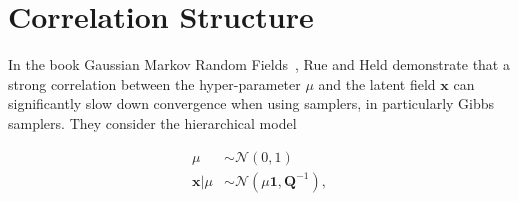 \chapter{Correlation Structure}
\label{ap:Correlation}
In the book Gaussian Markov Random Fields~\cite{rue2005gaussian}, Rue and Held demonstrate that a strong correlation between the hyper-parameter $\mu$ and the latent field $\bm{x}$ can significantly slow down convergence when using samplers, in particularly Gibbs samplers. 
They consider the hierarchical model

\begin{subequations}
\begin{align}
\mu &\sim \mathcal{N}(0, 1) \\
\bm{x} | \mu &\sim \mathcal{N}(\mu \bm{1}, \bm{Q}^{-1}),
\end{align}
\label{eq:rueMod}
\end{subequations}

